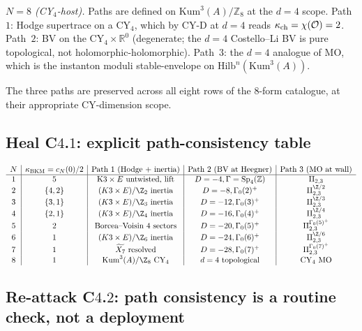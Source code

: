 \emph{$N = 8$ (CY$_4$-host).} Paths are defined on $\mathrm{Kum}^3(A) /
\mathbb{Z}_8$ at the $d = 4$ scope. Path~$1$: Hodge supertrace on a
CY$_4$, which by CY-D at $d = 4$ reads $\kappa_{\mathrm{ch}} = \chi(\mathcal{O}) = 2$.
Path~$2$: BV on the CY$_4 \times \mathbb{R}^0$ (degenerate; the $d = 4$
Costello--Li BV is pure topological, not holomorphic-holomorphic).
Path~$3$: the $d = 4$ analogue of MO, which is the instanton moduli
stable-envelope on $\mathrm{Hilb}^n(\mathrm{Kum}^3(A))$.

The three paths are preserved across all eight rows of the 8-form
catalogue, at their appropriate CY-dimension scope.

\subsection*{Heal C$4$.$1$: explicit path-consistency table}

\[
\begin{array}{c|c|c|c|c}
 N & \kBKM = c_N(0)/2 & \text{Path 1 (Hodge + inertia)} & \text{Path 2 (BV at Heegner)} & \text{Path 3 (MO at wall)} \\ \hline
 1 & 5 & \text{K}3 \times E \text{ untwisted, lift} & D = -4, \Gamma = \SpFour & \mathrm{II}_{2,3} \\
 2 & \{4, 2\} & (K3 \times E)/\Z_2 \text{ inertia} & D = -8, \Gamma_0(2)^+ & \mathrm{II}_{2,3}^{\Z/2} \\
 3 & \{3, 1\} & (K3 \times E)/\Z_3 \text{ inertia} & D = -12, \Gamma_0(3)^+ & \mathrm{II}_{2,3}^{\Z/3} \\
 4 & \{2, 1\} & (K3 \times E)/\Z_4 \text{ inertia} & D = -16, \Gamma_0(4)^+ & \mathrm{II}_{2,3}^{\Z/4} \\
 5 & 2 & \text{Borcea--Voisin 4 sectors} & D = -20, \Gamma_0(5)^+ & \mathrm{II}_{2,3}^{\Gamma_0(5)^+} \\
 6 & 1 & (K3 \times E)/\Z_6 \text{ inertia} & D = -24, \Gamma_0(6)^+ & \mathrm{II}_{2,3}^{\Z/6} \\
 7 & 1 & \widetilde{X_7} \text{ resolved} & D = -28, \Gamma_0(7)^+ & \mathrm{II}_{2,3}^{\Gamma_0(7)^+} \\
 8 & 1 & \mathrm{Kum}^3(A)/\Z_8 \text{ CY}_4 & d = 4 \text{ topological} & \mathrm{CY}_4 \text{ MO} \\
\end{array}
\]

\subsection*{Re-attack C$4$.$2$: path consistency is a routine check,
not a deployment}

